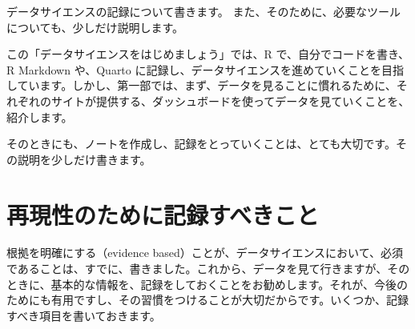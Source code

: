 \documentclass[
  xelatex, ja=standard]{bxjsbook}
\theoremstyle{definition}
\theoremstyle{definition}
\theoremstyle{definition}
\theoremstyle{definition}
\theoremstyle{remark}
\begin{document}
データサイエンスの記録について書きます。 また、そのために、必要なツールについても、少しだけ説明します。

この「データサイエンスをはじめましょう」では、R で、自分でコードを書き、R Markdown や、Quarto に記録し、データサイエンスを進めていくことを目指しています。しかし、第一部では、まず、データを見ることに慣れるために、それぞれのサイトが提供する、ダッシュボードを使ってデータを見ていくことを、紹介します。

そのときにも、ノートを作成し、記録をとっていくことは、とても大切です。その説明を少しだけ書きます。

\hypertarget{ux518dux73feux6027ux306eux305fux3081ux306bux8a18ux9332ux3059ux3079ux304dux3053ux3068}{%
\section{再現性のために記録すべきこと}\label{ux518dux73feux6027ux306eux305fux3081ux306bux8a18ux9332ux3059ux3079ux304dux3053ux3068}}

根拠を明確にする（evidence based）ことが、データサイエンスにおいて、必須であることは、すでに、書きました。これから、データを見て行きますが、そのときに、基本的な情報を、記録をしておくことをお勧めします。それが、今後のためにも有用ですし、その習慣をつけることが大切だからです。いくつか、記録すべき項目を書いておきます。
\end{document}
